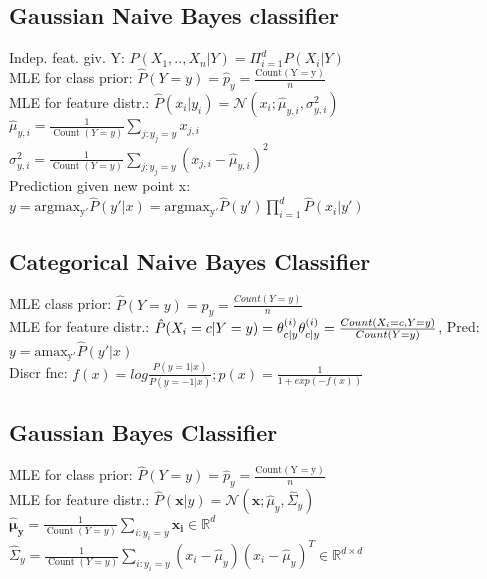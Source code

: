 \subsection*{Gaussian Naive Bayes classifier}
Indep. feat. giv. Y: $P(X_1,..,X_n|Y) = \Pi_{i=1}^dP(X_i|Y)$\\
MLE for class prior: $\hat{P}(Y=y) = \hat{p}_y = \frac{\operatorname{Count(Y = y)}}{n}$\\
MLE for feature distr.: $\hat{P}(x_i|y_i) =  \mathcal{N}(x_i;\hat{\mu}_{y,i}, \sigma_{y,i}^2)$\\
$\hat{\mu}_{y,i} = \frac{1}{\operatorname{Count}(Y=y)} \sum_{j:y_j=y} x_{j,i}$\\
$\sigma_{y,i}^2 = \frac{1}{\operatorname{Count}(Y=y)} \sum_{j:y_j=y} (x_{j,i} - \hat{\mu}_{y,i})^2$\\
Prediction given new point x:\\
$y = \operatorname{argmax_{y'}} \hat{P}(y'|x) = \operatorname{argmax_{y'}} \hat{P}(y') \prod_{i=1}^d \hat{P}(x_i|y')$

\subsection*{Categorical Naive Bayes Classifier}
MLE class prior: $\hat{P}(Y=y) = p_y = \frac{Count(Y=y)}{n}$\\
MLE for feature distr.:
$\hat{P}(X_i = c|Y = y) = \theta_{c|y}^{(i)}\\
\theta_{c|y}^{(i)} = \frac{Count(X_i = c, Y = y)}{Count(Y=y)}$, Pred: $y= \operatorname{amax_{y'}}\hat{P}(y'|x)$\\
Discr fnc: $f(x)=log\frac{P(y=1|x)}{P(y=-1|x)};p(x)=\frac{1}{1+exp(-f(x))}$

\subsection*{Gaussian Bayes Classifier}
MLE for class prior: $\hat{P}(Y=y) = \hat{p}_y = \frac{\operatorname{Count(Y = y)}}{n}$\\
MLE for feature distr.: $\hat{P}(\boldsymbol{x}|y) = \mathcal{N}(\boldsymbol{x} ; \hat{\mu}_y, \hat{\Sigma}_y)$\\
$\boldsymbol{\hat{\mu}_{y}} = \frac{1}{\operatorname{Count}(Y=y)} \sum_{i:y_i=y} \boldsymbol{x_i} \in \mathbb{R}^d$\\
$\hat{\Sigma}_{y} = \frac{1}{\operatorname{Count}(Y=y)} \sum_{i:y_i=y} (x_i - \hat{\mu}_{y})(x_i-\hat{\mu}_y)^T \in \mathbb{R}^{d \times d}$

